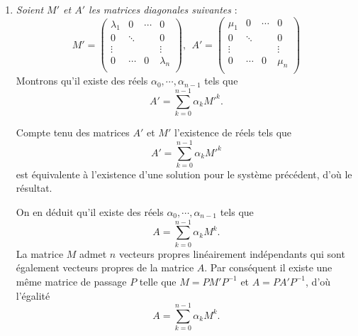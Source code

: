 {{\begin {enumerate}
\begin {enumerate}
Ce d\'eterminant est le d\'eterminant du syst\`eme suivant, 
$$\left\{\begin{align*}\mu_1&=\alpha_0+\alpha_1\lambda_1+\cdots+\alpha_{n-1}\lambda_1^{n-1} \\ 
\vdots \\  \mu_n &=\alpha_0+\alpha_1\lambda_n+\cdots+\alpha_{n-1}\lambda_n^{n-1} \\ \end{align*} \right.$$
or $V(\lambda_1,\cdots,\lambda_n)\neq0$ puisque les $\lambda_i$ sont suppos\'es distincts, c'est donc un syst\`eme de Cramer, il admet donc une unique solution $(\alpha_0,\cdots,\alpha_{n-1})\in\R^n.$
    \item {\it Soient $M'$ et $A'$ les matrices diagonales suivantes} :
$$M'=\begin{pmatrix}
\lambda_1 & 0 &\cdots & 0 \\  
0 &\ddots  & & 0 \\ \vdots & &  & \vdots \\  
0 & \cdots & 0 &\lambda_n \\ 
\end{pmatrix},\ \ 
A'=\begin{pmatrix}
\mu_1 & 0 &\cdots & 0 \\  
0 &\ddots  & & 0 \\
\vdots & &  & \vdots \\  
0 & \cdots & 0 &\mu_n \\ 
\end{pmatrix}$$
Montrons qu'il existe des r\'eels $\alpha_0,\cdots,\alpha_{n-1}$ tels que
$$A'=\sum_{k=0}^{n-1}\alpha_k M'^k.$$

Compte tenu des matrices $A'$ et $M'$ l'existence de r\'eels tels que $$A'=\sum_{k=0}^{n-1}\alpha_k M'^k$$ est \'equivalente \`a l'existence d'une solution pour le syst\`eme pr\'ec\'edent, d'o\`u le r\'esultat.

On en d\'eduit qu'il existe des r\'eels $\alpha_0,\cdots,\alpha_{n-1}$ tels que
$$A=\sum_{k=0}^{n-1}\alpha_k M^k.$$ 
La matrice $M$ admet $n$ vecteurs propres lin\'eairement ind\'ependants qui sont \'egalement vecteurs propres de la matrice $A$. Par cons\'equent il existe une m\^eme matrice de passage $P$ telle que $M=PM'P^{-1}$ et $A=PA'P^{-1}$, d'o\`u l'\'egalit\'e 
$$A=\sum_{k=0}^{n-1}\alpha_k M^k.$$   
  \end {enumerate}
\end {enumerate}
}
}
